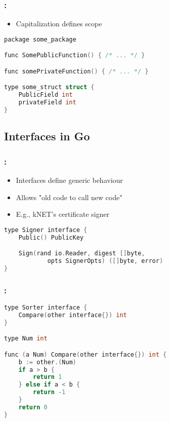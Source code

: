 \begin{frame}[fragile]
    \frametitle{\secname: \small\subsecname\normalsize}

    \begin{itemize}
        \item Capitalization defines scope
    \end{itemize}


    \small \begin{lstlisting}[language=c]
package some_package

func SomePublicFunction() { /* ... */ }

func somePrivateFunction() { /* ... */ }

type some_struct struct {
    PublicField int
    privateField int
}
    \end{lstlisting} \normalsize
\end{frame}

\subsection{Interfaces in Go}

\begin{frame}[fragile]
    \frametitle{\secname: \small\subsecname\normalsize}

    \begin{itemize}
        \item Interfaces define generic behaviour
        \item Allows "old code to call new code"
        \item E.g., kNET's certificate signer
    \end{itemize}

    \small \begin{lstlisting}[language=c]
type Signer interface {
    Public() PublicKey

    Sign(rand io.Reader, digest []byte,
            opts SignerOpts) ([]byte, error)
}
    \end{lstlisting} \normalsize
\end{frame}

\begin{frame}[fragile]
    \frametitle{\secname: \small\subsecname\normalsize}

    \small \begin{lstlisting}[language=c]
type Sorter interface {
    Compare(other interface{}) int
}

type Num int

func (a Num) Compare(other interface{}) int {
    b := other.(Num)
    if a > b {
        return 1
    } else if a < b {
        return -1
    }
    return 0
}
    \end{lstlisting} \normalsize
\end{frame}
